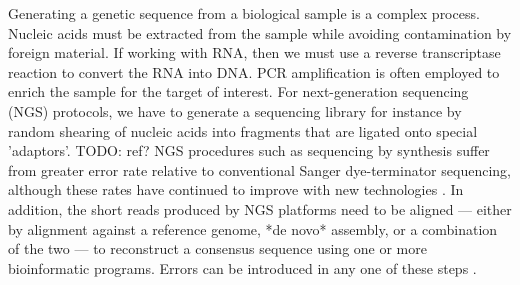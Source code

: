 \documentclass[10pt]{article}
\begin{document}
Generating a genetic sequence from a biological sample is a complex process.
Nucleic acids must be extracted from the sample while avoiding contamination by foreign material.
If working with RNA, then we must use a reverse transcriptase reaction to convert the RNA into DNA.
PCR amplification is often employed to enrich the sample for the target of interest.
For next-generation sequencing (NGS) protocols, we have to generate a sequencing library for instance by random shearing of nucleic acids into fragments that are ligated onto special 'adaptors'. TODO: ref?
NGS procedures such as sequencing by synthesis suffer from greater error rate relative to conventional Sanger dye-terminator sequencing, although these rates have continued to improve with new technologies \citep{fullerChallengesSequencingSynthesis2009}.
In addition, the short reads produced by NGS platforms need to be aligned --- either by alignment against a reference genome, *de novo* assembly, or a combination of the two --- to reconstruct a consensus sequence using one or more bioinformatic programs.
Errors can be introduced in any one of these steps \citep{beerenwinkelUltradeepSequencingAnalysis2011, oraweAccountingUncertaintyDNA2015}.
\end{document}
